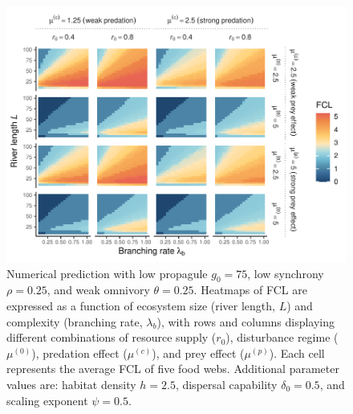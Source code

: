 \begin{figure}
\centering
\includegraphics{../data_fmt/fig_rho025_g75_theta025.pdf}
\caption{\label{fig:fig-num1}Numerical prediction with low propagule
\(g_0 = 75\), low synchrony \(\rho = 0.25\), and weak omnivory
\(\theta = 0.25\). Heatmaps of FCL are expressed as a function of
ecosystem size (river length, \(L\)) and complexity (branching rate,
\(\lambda_b\)), with rows and columns displaying different combinations
of resource supply (\(r_0\)), disturbance regime (\(\mu^{(0)}\)),
predation effect (\(\mu^{(c)}\)), and prey effect (\(\mu^{(p)}\)). Each
cell represents the average FCL of five food webs. Additional parameter
values are: habitat density \(h=2.5\), dispersal capability
\(\delta_0=0.5\), and scaling exponent \(\psi=0.5\).}
\end{figure}

\newpage


